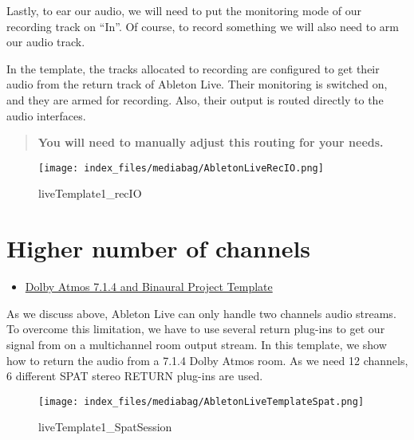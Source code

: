\documentclass[
  letterpaper,
  DIV=11,
  numbers=noendperiod]{scrreport}
\providecommand{\tightlist}{%
  \setlength{\itemsep}{0pt}\setlength{\parskip}{0pt}}\usepackage{longtable,booktabs,array}
\begin{document}
Lastly, to ear our audio, we will need to put the monitoring mode of our
recording track on ``In''. Of course, to record something we will also
need to arm our audio track.

In the template, the tracks allocated to recording are configured to get
their audio from the return track of Ableton Live. Their monitoring is
switched on, and they are armed for recording. Also, their output is
routed directly to the audio interfaces.

\begin{quote}
\textbf{You will need to manually adjust this routing for your needs.}
\end{quote}

\begin{figure}

{\centering \texttt{[image: index\_files/mediabag/AbletonLiveRecIO.png]}

}

\caption{liveTemplate1\_recIO}

\end{figure}

\hypertarget{higher-number-of-channels}{%
\section{Higher number of channels}\label{higher-number-of-channels}}

\begin{itemize}
\tightlist
\item
  \href{https://public.3.basecamp.com/p/n7mNHM6PJTeep8ewttYNFxtr}{Dolby
  Atmos 7.1.4 and Binaural Project Template}
\end{itemize}

As we discuss above, Ableton Live can only handle two channels audio
streams. To overcome this limitation, we have to use several return
plug-ins to get our signal from on a multichannel room output stream. In
this template, we show how to return the audio from a 7.1.4 Dolby Atmos
room. As we need 12 channels, 6 different SPAT stereo RETURN plug-ins
are used.

\begin{figure}

{\centering \texttt{[image: index\_files/mediabag/AbletonLiveTemplateSpat.png]}

}

\caption{liveTemplate1\_SpatSession}

\end{figure}
\end{document}
